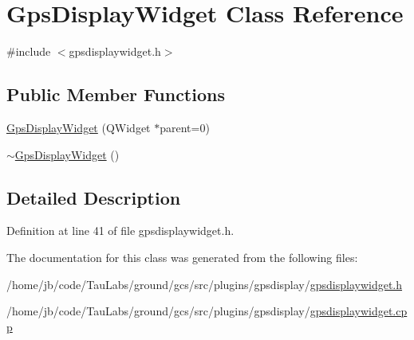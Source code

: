 \hypertarget{class_gps_display_widget}{\section{\-Gps\-Display\-Widget \-Class \-Reference}
\label{class_gps_display_widget}
}


{\ttfamily \#include $<$gpsdisplaywidget.\-h$>$}

\subsection*{\-Public \-Member \-Functions}
\begin{DoxyCompactItemize}
\item 
\hyperlink{group___g_p_s_gadget_plugin_gab1f79fecf5da3b9fde3b8c100406dfd8}{\-Gps\-Display\-Widget} (\-Q\-Widget $\ast$parent=0)
\item 
\hyperlink{group___g_p_s_gadget_plugin_gaf71af26494c1e959b1b6b3eabd861e53}{$\sim$\-Gps\-Display\-Widget} ()
\end{DoxyCompactItemize}


\subsection{\-Detailed \-Description}


\-Definition at line 41 of file gpsdisplaywidget.\-h.



\-The documentation for this class was generated from the following files\-:\begin{DoxyCompactItemize}
\item 
/home/jb/code/\-Tau\-Labs/ground/gcs/src/plugins/gpsdisplay/\hyperlink{gpsdisplaywidget_8h}{gpsdisplaywidget.\-h}\item 
/home/jb/code/\-Tau\-Labs/ground/gcs/src/plugins/gpsdisplay/\hyperlink{gpsdisplaywidget_8cpp}{gpsdisplaywidget.\-cpp}\end{DoxyCompactItemize}
